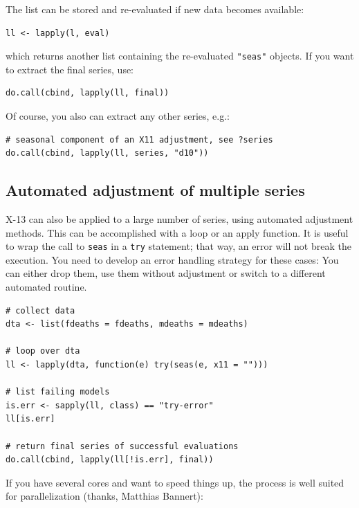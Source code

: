 The list can be stored and re-evaluated if new data becomes available:

\begin{verbatim}
ll <- lapply(l, eval)
\end{verbatim}

which returns another list containing the re-evaluated \texttt{"seas"}
objects. If you want to extract the final series, use:

\begin{verbatim}
do.call(cbind, lapply(ll, final))
\end{verbatim}

Of course, you also can extract any other series, e.g.:

\begin{verbatim}
# seasonal component of an X11 adjustment, see ?series
do.call(cbind, lapply(ll, series, "d10"))
\end{verbatim}

\subsection{Automated adjustment of multiple
series}\label{automated-adjustment-of-multiple-series}

X-13 can also be applied to a large number of series, using automated
adjustment methods. This can be accomplished with a loop or an apply
function. It is useful to wrap the call to \texttt{seas} in a
\texttt{try} statement; that way, an error will not break the execution.
You need to develop an error handling strategy for these cases: You can
either drop them, use them without adjustment or switch to a different
automated routine.

\begin{verbatim}
# collect data 
dta <- list(fdeaths = fdeaths, mdeaths = mdeaths)

# loop over dta
ll <- lapply(dta, function(e) try(seas(e, x11 = "")))

# list failing models
is.err <- sapply(ll, class) == "try-error"
ll[is.err]

# return final series of successful evaluations
do.call(cbind, lapply(ll[!is.err], final))
\end{verbatim}

If you have several cores and want to speed things up, the process is
well suited for parallelization (thanks, Matthias Bannert):

